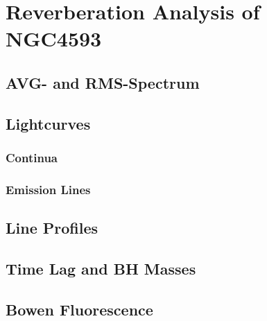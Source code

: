 \chapter{Reverberation Analysis of NGC4593}

\section{AVG- and RMS-Spectrum}

\section{Lightcurves}

\subsection{Continua}

\subsection{Emission Lines}

\section{Line Profiles}

\section{Time Lag and BH Masses}

\section{Bowen Fluorescence}